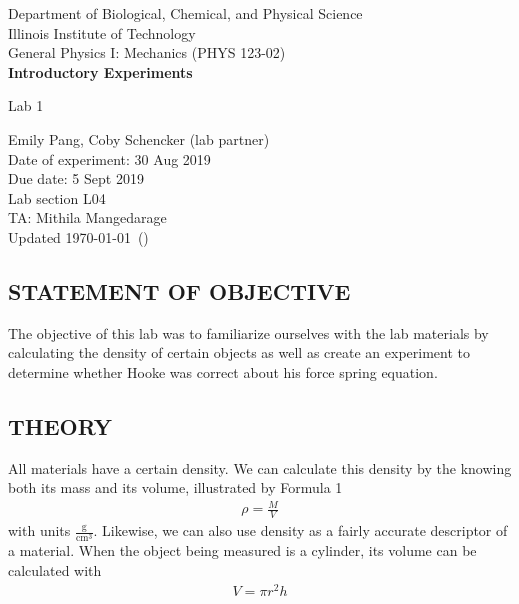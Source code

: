 \documentclass [12pt, letterpaper, twoside] {article}
\begin{document}
\begin {titlepage}
\begin {center}
Department of Biological, Chemical, and Physical Science\\
\vspace {0.1cm}
Illinois Institute of Technology\\
\vspace {0.1cm}
General Physics I: Mechanics (PHYS 123-02)\\
\vspace* {\fill}
\begingroup
\Large
\textbf {Introductory Experiments}
\vspace {0.35cm}

\normalsize
Lab 1
\vspace {1.5cm}
\endgroup
\vspace* {\fill}
\end {center}

\vspace*{\fill}
\begin {flushright}
\footnotesize
Emily Pang, Coby Schencker (lab partner)\\
Date of experiment: 30 Aug 2019\\
Due date: 5 Sept 2019\\
Lab section L04\\
TA: Mithila Mangedarage\\
Updated \usdate\today~(\currenttime)
\end {flushright}
\end {titlepage}
\subsection* {STATEMENT OF OBJECTIVE}
The objective of this lab was to familiarize ourselves with the lab materials by calculating the density of certain objects as well as create an experiment to determine whether Hooke was correct about his force spring equation.\\

\subsection* {THEORY}
\noindent
All materials have a certain density. We can calculate this density by the knowing both its mass and its volume, illustrated by Formula 1
\begin {equation}
  \begin {split}
    \rho=\tfrac{M}{V}
  \end {split}
\end {equation}
with units \(\tfrac{\text{g}}{\text{cm}^3}\). Likewise, we can also use density as a fairly accurate descriptor of a material. When the object being measured is a cylinder, its volume can be calculated with
\begin {equation}
  \begin {split}
    V=\pi{}r^2h
  \end {split}
\end {equation}
\end{document}
